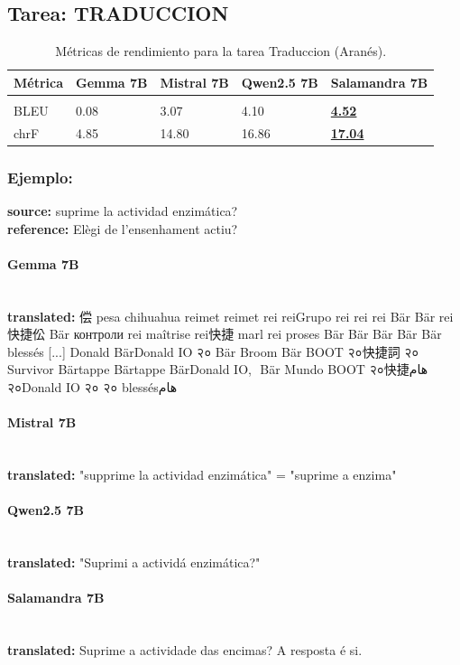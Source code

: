 \subsection{Tarea: TRADUCCION}\label{tarea-traduccion}
\begin{longtable}[]{@{}lllll@{}}
\toprule\noalign{}
Métrica & Gemma 7B & Mistral 7B & Qwen2.5 7B & Salamandra 7B \\
\midrule\noalign{}
\endhead
\bottomrule\noalign{}
\caption{Métricas de rendimiento para la tarea Traduccion (Aranés).}
\label{tab:metricas_traduccion_Aranés}\\
\endlastfoot
BLEU & 0.08 & 3.07 & 4.10 & \textbf{\underline{4.52}} \\
chrF & 4.85 & 14.80 & 16.86 & \textbf{\underline{17.04}} \\
\end{longtable}

\subsubsection{Ejemplo:}
\textbf{source:} suprime la actividad enzimática?\\
\textbf{reference:} Elègi de l’ensenhament actiu?

\paragraph{Gemma 7B}~\\
\textbf{translated:} 偿 pesa chihuahua reimet reimet rei reiGrupo rei rei rei Bär Bär rei快捷伀 Bär контроли rei maîtrise rei快捷 marl rei proses Bär Bär Bär Bär Bär blessés [...] Donald BärDonald IO २० Bär Broom Bär BOOT २०快捷詞 २० Survivor Bärtappe Bärtappe BärDonald IO,\,\ Bär Mundo BOOT २०快捷هام २०Donald IO २० २० blessésهام

\paragraph{Mistral 7B}~\\
\textbf{translated:} "supprime la actividad enzimática" = "suprime a enzima"

\paragraph{Qwen2.5 7B}~\\
\textbf{translated:} "Suprimi a actividá enzimática?"

\paragraph{Salamandra 7B}~\\
\textbf{translated:} Suprime a actividade das encimas?  A resposta é si.

